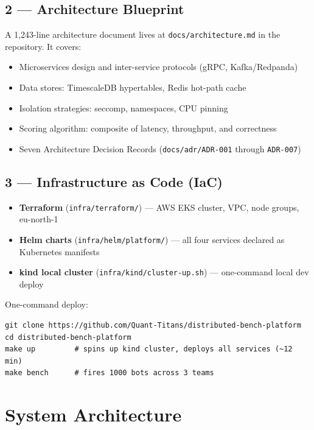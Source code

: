 \documentclass[12pt,a4paper]{article}
\begin{document}
\subsection{2 — Architecture Blueprint}

A 1{,}243-line architecture document lives at \texttt{docs/architecture.md} in the repository. It covers:

\begin{itemize}[leftmargin=1.5em]
  \item Microservices design and inter-service protocols (gRPC, Kafka/Redpanda)
  \item Data stores: TimescaleDB hypertables, Redis hot-path cache
  \item Isolation strategies: seccomp, namespaces, CPU pinning
  \item Scoring algorithm: composite of latency, throughput, and correctness
  \item Seven Architecture Decision Records (\texttt{docs/adr/ADR-001} through \texttt{ADR-007})
\end{itemize}

\subsection{3 — Infrastructure as Code (IaC)}

\begin{itemize}[leftmargin=1.5em]
  \item \textbf{Terraform} (\texttt{infra/terraform/}) — AWS EKS cluster, VPC, node groups, eu-north-1
  \item \textbf{Helm charts} (\texttt{infra/helm/platform/}) — all four services declared as Kubernetes manifests
  \item \textbf{kind local cluster} (\texttt{infra/kind/cluster-up.sh}) — one-command local dev deploy
\end{itemize}

One-command deploy:
\begin{lstlisting}
git clone https://github.com/Quant-Titans/distributed-bench-platform
cd distributed-bench-platform
make up         # spins up kind cluster, deploys all services (~12 min)
make bench      # fires 1000 bots across 3 teams
\end{lstlisting}

\section{System Architecture}
\end{document}
